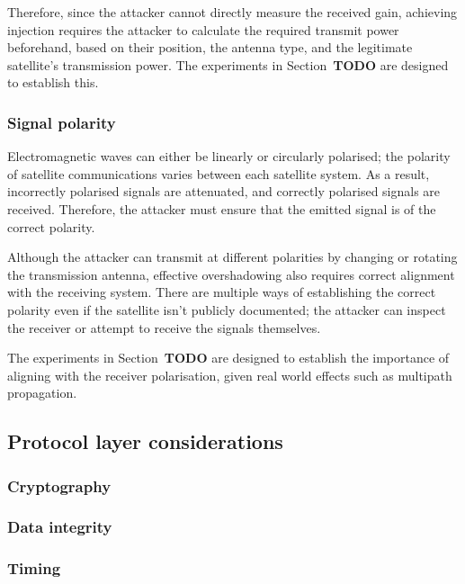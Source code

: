 Therefore, since the attacker cannot directly measure the received gain, achieving injection requires the attacker to calculate the required transmit power beforehand, based on their position, the antenna type, and the legitimate satellite's transmission power.
The experiments in Section~\textbf{TODO} are designed to establish this.

\subsubsection{Signal polarity}

Electromagnetic waves can either be linearly or circularly polarised; the polarity of satellite communications varies between each satellite system.
As a result, incorrectly polarised signals are attenuated, and correctly polarised signals are received.
Therefore, the attacker must ensure that the emitted signal is of the correct polarity.

Although the attacker can transmit at different polarities by changing or rotating the transmission antenna, effective overshadowing also requires correct alignment with the receiving system.
There are multiple ways of establishing the correct polarity even if the satellite isn't publicly documented; the attacker can inspect the receiver or attempt to receive the signals themselves.

The experiments in Section~\textbf{TODO} are designed to establish the importance of aligning with the receiver polarisation, given real world effects such as multipath propagation.

\subsection{Protocol layer considerations}

\subsubsection{Cryptography}

\subsubsection{Data integrity}

\subsubsection{Timing}


